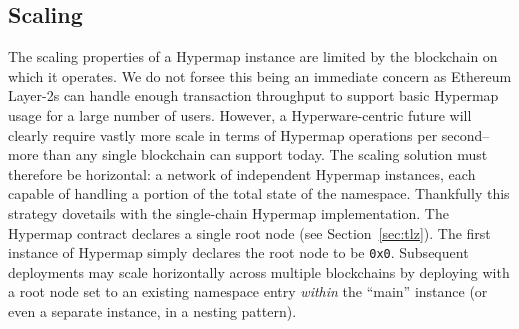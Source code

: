 \documentclass[runningheads]{llncs}
\begin{document}




\subsection{Scaling}

The scaling properties of a Hypermap instance are limited by the blockchain on which it operates.
We do not forsee this being an immediate concern as Ethereum Layer-2s can handle enough transaction throughput to support basic Hypermap usage for a large number of users.
However, a Hyperware-centric future will clearly require vastly more scale in terms of Hypermap operations per second–more than any single blockchain can support today.
The scaling solution must therefore be horizontal: a network of independent Hypermap instances, each capable of handling a portion of the total state of the namespace.
Thankfully this strategy dovetails with the single-chain Hypermap implementation.
The Hypermap contract declares a single root node (see Section~\ref{sec:tlz}).
The first instance of Hypermap simply declares the root node to be \verb|0x0|.
Subsequent deployments may scale horizontally across multiple blockchains by deploying with a root node set to an existing namespace entry \textit{within} the ``main'' instance (or even a separate instance, in a nesting pattern).
\end{document}
